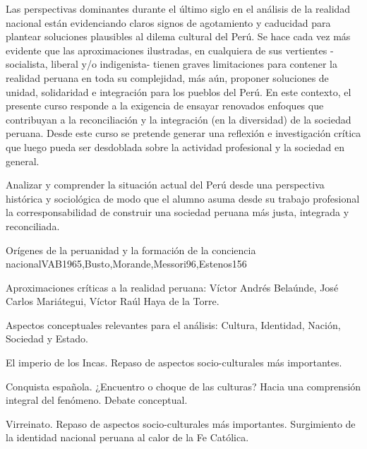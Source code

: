 \begin{syllabus}


\begin{justification}
Las perspectivas dominantes durante el último siglo en el análisis de la realidad nacional están evidenciando claros signos de agotamiento y caducidad para plantear soluciones plausibles al dilema cultural del Perú. Se hace cada vez más evidente que las aproximaciones ilustradas, en cualquiera de sus  vertientes -socialista, liberal y/o indigenista- tienen graves limitaciones para contener la realidad peruana en toda su complejidad, más aún, proponer soluciones de unidad, solidaridad e integración para los pueblos del Perú. 
En este contexto, el presente curso responde a la exigencia de ensayar renovados enfoques que contribuyan a la reconciliación y la integración (en la diversidad) de la sociedad peruana. Desde este curso se pretende generar una reflexión e investigación crítica que luego pueda ser desdoblada sobre la actividad profesional y la sociedad en general.
\end{justification}

\begin{goals}
\item Analizar y comprender la situación actual del Perú desde una perspectiva histórica y sociológica de modo que el alumno asuma desde su trabajo profesional la corresponsabilidad de construir una sociedad peruana más justa, integrada y reconciliada.
\end{goals}

\begin{outcomes}
\end{outcomes}

\begin{unit}{Orígenes de la peruanidad y la formación de la conciencia nacional}{VAB1965,Busto,Morande,Messori96,Estenos}{15}{6}
\begin{topics}
	\item Aproximaciones críticas a la realidad peruana: Víctor Andrés Belaúnde, José Carlos Mariátegui, Víctor Raúl Haya de la Torre.
	\item Aspectos conceptuales relevantes para el análisis: Cultura, Identidad, Nación, Sociedad y Estado. 
	\item El imperio de los Incas. Repaso de  aspectos socio-culturales más importantes. 
	\item Conquista española. ¿Encuentro o choque de las culturas? Hacia una comprensión integral del fenómeno. Debate conceptual. 
	\item Virreinato. Repaso de  aspectos socio-culturales más importantes. Surgimiento de la identidad nacional peruana al calor de la Fe Católica.  


\end{topics}
\end{unit}
\end{syllabus}
